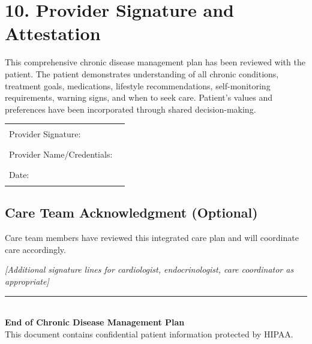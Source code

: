 \documentclass[11pt,letterpaper]{article}
\begin{document}
\vspace{2em}

\section*{10. Provider Signature and Attestation}

This comprehensive chronic disease management plan has been reviewed with the patient. The patient demonstrates understanding of all chronic conditions, treatment goals, medications, lifestyle recommendations, self-monitoring requirements, warning signs, and when to seek care. Patient's values and preferences have been incorporated through shared decision-making.

\vspace{1em}

\begin{tabular}{ll}
Provider Signature: & \rule{7cm}{0.5pt} \\[1em]
Provider Name/Credentials: & \rule{7cm}{0.5pt} \\[1em]
Date: & \rule{4cm}{0.5pt} \\[2em]
\end{tabular}

\subsection*{Care Team Acknowledgment (Optional)}

Care team members have reviewed this integrated care plan and will coordinate care accordingly.

\vspace{0.5em}

\textit{[Additional signature lines for cardiologist, endocrinologist, care coordinator as appropriate]}

\vspace{2em}
\begin{center}
\rule{\textwidth}{1pt}\\
\textbf{End of Chronic Disease Management Plan}\\
This document contains confidential patient information protected by HIPAA.
\end{center}
\end{document}
